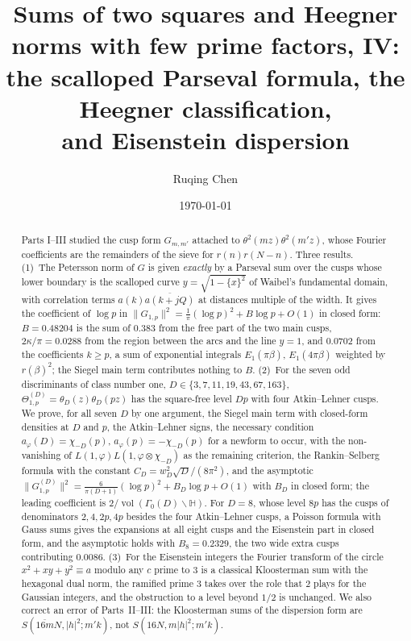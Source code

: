 \documentclass[11pt]{amsart}
\title[Sums of two squares and Heegner norms, IV]{Sums of two squares and Heegner norms with few prime factors, IV:\texorpdfstring{\\}{ } the scalloped Parseval formula, the Heegner classification,\texorpdfstring{\\}{ } and Eisenstein dispersion}
\author{Ruqing Chen}
\date{\today}
\theoremstyle{remark}
\newcommand{\HH}{\mathbb{H}}
\DeclareMathOperator{\vol}{vol}
\begin{document}
\begin{abstract}
Parts I--III studied the cusp form $G_{m,m'}$ attached to $\theta^2(mz)\theta^2(m'z)$, whose Fourier coefficients are the remainders of the sieve for $r(n)r(N-n)$. Three results. (1)~The Petersson norm of $G$ is given \emph{exactly} by a Parseval sum over the cusps whose lower boundary is the scalloped curve $y=\sqrt{1-\{x\}^2}$ of Waibel's fundamental domain, with correlation terms $a(k)\overline{a(k+jQ)}$ at distances multiple of the width. It gives the coefficient of $\log p$ in $\|G_{1,p}\|^2=\frac1\pi(\log p)^2+B\log p+O(1)$ in closed form: $B=0.48204$ is the sum of $0.383$ from the free part of the two main cusps, $2\kappa/\pi=0.0288$ from the region between the arcs and the line $y=1$, and $0.0702$ from the coefficients $k\ge p$, a sum of exponential integrals $E_1(\pi\beta)$, $E_1(4\pi\beta)$ weighted by $r(\beta)^2$; the Siegel main term contributes nothing to $B$. (2)~For the seven odd discriminants of class number one, $D\in\{3,7,11,19,43,67,163\}$, $\Theta^{(D)}_{1,p}=\theta_D(z)\theta_D(pz)$ has the square-free level $Dp$ with four Atkin--Lehner cusps. We prove, for all seven $D$ by one argument, the Siegel main term with closed-form densities at $D$ and $p$, the Atkin--Lehner signs, the necessary condition $a_\varphi(D)=\chi_{-D}(p)$, $a_\varphi(p)=-\chi_{-D}(p)$ for a newform to occur, with the non-vanishing of $L(1,\varphi)L(1,\varphi\otimes\chi_{-D})$ as the remaining criterion, the Rankin--Selberg formula with the constant $C_D=w_D^2\sqrt D/(8\pi^2)$, and the asymptotic $\|G^{(D)}_{1,p}\|^2=\frac{6}{\pi(D+1)}(\log p)^2+B_D\log p+O(1)$ with $B_D$ in closed form; the leading coefficient is $2/\vol(\Gamma_0(D)\backslash\HH)$. For $D=8$, whose level $8p$ has the cusps of denominators $2,4,2p,4p$ besides the four Atkin--Lehner cusps, a Poisson formula with Gauss sums gives the expansions at all eight cusps and the Eisenstein part in closed form, and the asymptotic holds with $B_8=0.2329$, the two wide extra cusps contributing $0.0086$. (3)~For the Eisenstein integers the Fourier transform of the circle $x^2+xy+y^2\equiv a$ modulo any $c$ prime to $3$ is a classical Kloosterman sum with the hexagonal dual norm, the ramified prime $3$ takes over the role that $2$ plays for the Gaussian integers, and the obstruction to a level beyond $1/2$ is unchanged. We also correct an error of Parts~II--III: the Kloosterman sums of the dispersion form are $S(\overline{16m}N,|h|^2;m'k)$, not $S(16N,m|h|^2;m'k)$.
\end{abstract}
\end{document}
